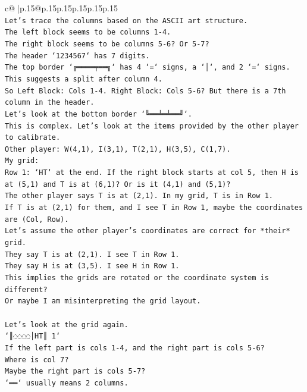 \documentclass{article}
\begin{document}
{\begin{supertabular}{c@{$\;$}|p{.15\linewidth}@{}p{.15\linewidth}p{.15\linewidth}p{.15\linewidth}p{.15\linewidth}p{.15\linewidth}}
{{{\\ 
\texttt{Let's trace the columns based on the ASCII art structure.} \\
\texttt{The left block seems to be columns 1{-}4.} \\
\texttt{The right block seems to be columns 5{-}6? Or 5{-}7?} \\
\texttt{The header `1234567` has 7 digits.} \\
\texttt{The top border `╔════╤══╗` has 4 `=` signs, a `│`, and 2 `=` signs. This suggests a split after column 4.} \\
\texttt{So Left Block: Cols 1{-}4. Right Block: Cols 5{-}6? But there is a 7th column in the header.} \\
\texttt{Let's look at the bottom border `╚══╧═╧══╝`.} \\
\texttt{This is complex. Let's look at the items provided by the other player to calibrate.} \\
\texttt{Other player: W(4,1), I(3,1), T(2,1), H(3,5), C(1,7).} \\
\texttt{My grid:} \\
\texttt{Row 1: `HT` at the end. If the right block starts at col 5, then H is at (5,1) and T is at (6,1)? Or is it (4,1) and (5,1)?} \\
\texttt{The other player says T is at (2,1). In my grid, T is in Row 1.} \\
\texttt{If T is at (2,1) for them, and I see T in Row 1, maybe the coordinates are (Col, Row).} \\
\texttt{Let's assume the other player's coordinates are correct for *their* grid.} \\
\texttt{They say T is at (2,1). I see T in Row 1.} \\
\texttt{They say H is at (3,5). I see H in Row 1.} \\
\texttt{This implies the grids are rotated or the coordinate system is different?} \\
\texttt{Or maybe I am misinterpreting the grid layout.} \\
\\ 
\texttt{Let's look at the grid again.} \\
\texttt{`║◌◌◌◌│HT║ 1`} \\
\texttt{If the left part is cols 1{-}4, and the right part is cols 5{-}6?} \\
\texttt{Where is col 7?} \\
\texttt{Maybe the right part is cols 5{-}7?} \\
\texttt{`══` usually means 2 columns.} \\
}}}
\end{supertabular}}
\end{document}
